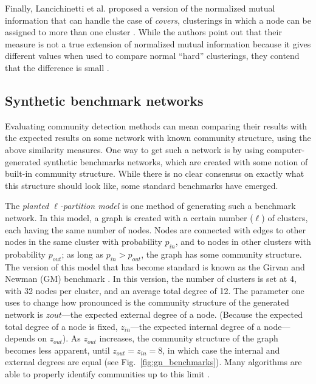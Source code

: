 Finally, Lancichinetti et al. proposed a version of the normalized
mutual information that can handle the case of \emph{covers},
clusterings in which a node can be assigned to more than one cluster
\autocite{lancichinetti_detecting_2009}. While the authors point out
that their measure is not a true extension of normalized mutual
information because it gives different values when used to compare
normal ``hard'' clusterings, they contend that the difference is small
\autocite{lancichinetti_community_2009}.

\subsection{Synthetic benchmark
networks}\label{synthetic-benchmark-networks}

Evaluating community detection methods can mean comparing their results
with the expected results on some network with known community
structure, using the above similarity measures. One way to get such a
network is by using computer-generated synthetic benchmarks networks,
which are created with some notion of built-in community structure.
While there is no clear consensus on exactly what this structure should
look like, some standard benchmarks have emerged.

The \emph{planted \(\ell\)-partition model} is one method of generating
such a benchmark network. In this model, a graph is created with a
certain number (\(\ell\)) of clusters, each having the same number of
nodes. Nodes are connected with edges to other nodes in the same cluster
with probability \(p_{in}\), and to nodes in other clusters with
probability \(p_{out}\); as long as \(p_{in} > p_{out}\), the graph has
some community structure. The version of this model that has become
standard is known as the Girvan and Newman (GM) benchmark
\autocite{girvan_community_2002}. In this version, the number of
clusters is set at 4, with 32 nodes per cluster, and an average total
degree of 12. The parameter one uses to change how pronounced is the
community structure of the generated network is \(z{out}\)---the
expected external degree of a node. (Because the expected total degree
of a node is fixed, \(z_{in}\)---the expected internal degree of a
node---depends on \(z_{out}\)). As \(z_{out}\) increases, the community
structure of the graph becomes less apparent, until
\(z_{out} = z_{in} = 8\), in which case the internal and external
degrees are equal (see Fig.~\ref{fig:gn_benchmarks}). Many algorithms
are able to properly identify communities up to this limit
\autocite{fortunato_community_2010}.

